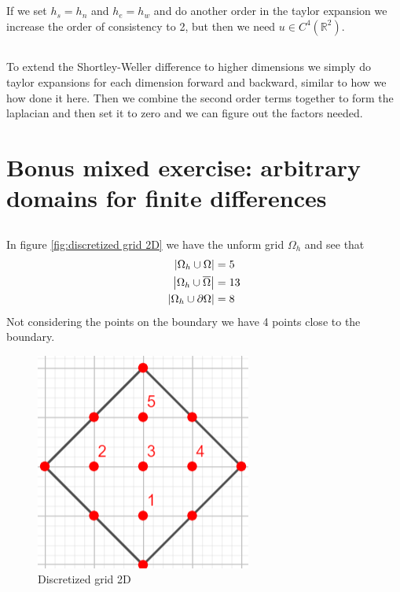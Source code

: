 \documentclass{homework}
\begin{document}
\subsection{}
If we set $h_s=h_n$ and $h_e=h_w$ and do another order in the taylor expansion we increase the order of consistency to 2, but then we need $u\in C^4(\mathbb{R}^2)$.
\subsection{}
To extend the Shortley-Weller difference to higher dimensions we simply do taylor expansions for each dimension forward and backward, similar to how we how done it here. Then we combine the second order terms together to form the laplacian and then set it to zero and we can figure out the factors needed.

\section{Bonus mixed exercise: arbitrary domains for finite differences}
\subsection{}
In figure \eqref{fig:discretized grid 2D} we have the unform grid $\Omega_h$ and see that
\begin{align*}
    \abs{\Omega_h\cup\Omega} &= 5\\
    \abs{\Omega_h\cup\overline{\Omega}} &= 13\\
    \abs{\Omega_h\cup\partial\Omega} &= 8
\end{align*}
Not considering the points on the boundary we have 4 points close to the boundary.
\begin{figure}[h]
    \centering
    \includegraphics{img/points_on_omega_with_numbers.PNG}
    \caption{Discretized grid 2D}
    \label{fig:discretized grid 2D}
\end{figure}
\end{document}
